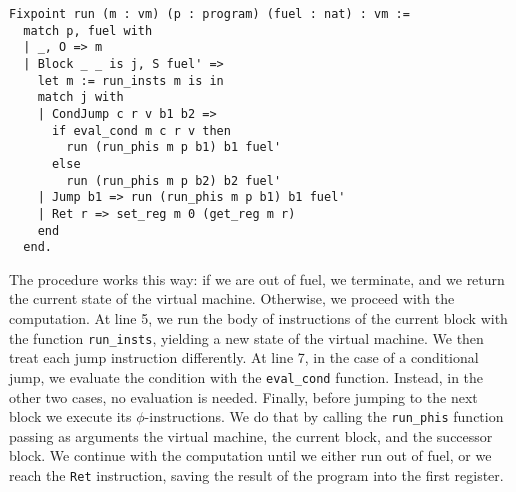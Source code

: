 \begin{lstlisting}[style=Rocq]
Fixpoint run (m : vm) (p : program) (fuel : nat) : vm :=
  match p, fuel with
  | _, O => m
  | Block _ _ is j, S fuel' =>
    let m := run_insts m is in
    match j with
    | CondJump c r v b1 b2 =>
      if eval_cond m c r v then
        run (run_phis m p b1) b1 fuel'
      else
        run (run_phis m p b2) b2 fuel'
    | Jump b1 => run (run_phis m p b1) b1 fuel'
    | Ret r => set_reg m 0 (get_reg m r)
    end
  end.
\end{lstlisting}

The procedure works this way: if we are out of fuel, we terminate, and we return the current state of the virtual machine. Otherwise, we proceed with the computation.
At line 5, we run the body of instructions of the current block with the function \texttt{run\_insts}, yielding a new state of the virtual machine. We then treat each jump instruction differently. At line 7, in the case of a conditional jump, we evaluate the condition with the \texttt{eval\_cond} function. Instead, in the other two cases, no evaluation is needed. Finally, before jumping to the next block we execute its $\phi$-instructions. We do that by calling the \texttt{run\_phis} function passing as arguments the virtual machine, the current block, and the successor block.
We continue with the computation until we either run out of fuel, or we reach the \texttt{Ret} instruction, saving the result of the program into the first register.